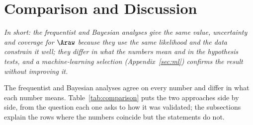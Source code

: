 \section{Comparison and Discussion}
\label{sec:comparison}
\emph{In short: the frequentist and Bayesian analyses give the same value, uncertainty and coverage for $\Araw$ because they use the same likelihood and the data constrain it well; they differ in what the numbers mean and in the hypothesis tests, and a machine-learning selection (Appendix~\ref{sec:ml}) confirms the result without improving it.}

\label{sec:comparison_summary}
The frequentist and Bayesian analyses agree on every number and differ in what each number means. Table~\ref{tab:comparison} puts the two approaches side by side, from the question each one asks to how it was validated; the subsections explain the rows where the numbers coincide but the statements do not.
